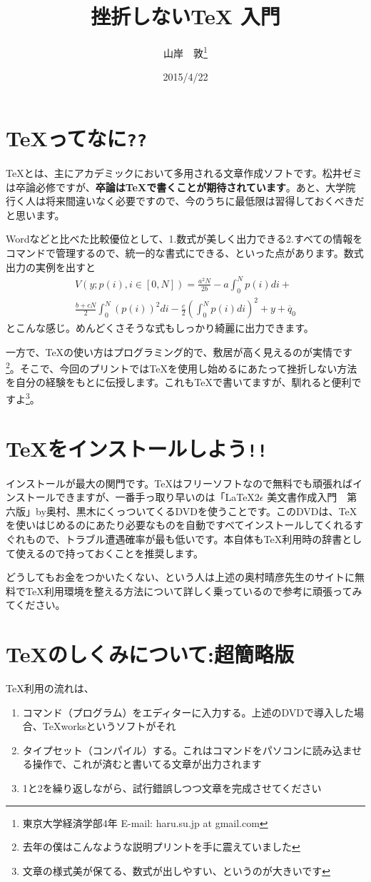 \documentclass[a4paper]{jarticle}
\title{挫折しないTeX 入門}
\author{山岸　敦\thanks{東京大学経済学部4年 E-mail: haru.su.jp at gmail.com}}
\date{2015/4/22}
\begin{document}
\maketitle

\section{\TeX ってなに\texttt{??} }
\TeX とは、主にアカデミックにおいて多用される文章作成ソフトです。松井ゼミは卒論必修ですが、{\bf 卒論は\TeX で書くことが期待されています}。あと、大学院行く人は将来間違いなく必要ですので、今のうちに最低限は習得しておくべきだと思います。

Wordなどと比べた比較優位として、1.数式が美しく出力できる2.すべての情報をコマンドで管理するので、統一的な書式にできる、といった点があります。数式出力の実例を出すと
\begin{multline}
V(y;p(i), i \in[0, N]) = \frac{a^2N}{2b} - a \int_{0}^{N}p(i)di + \\
 \frac{b + cN}{2}\int_{0}^{N}(p(i))^2di - \frac{c}{2}(\int_{0}^{N}p(i)di)^2 + y + \overline{q}_0
\end{multline}
とこんな感じ。めんどくさそうな式もしっかり綺麗に出力できます。

一方で、\TeX の使い方はプログラミング的で、敷居が高く見えるのが実情です\footnote{去年の僕はこんなような説明プリントを手に震えていました}。そこで、今回のプリントでは\TeX を使用し始めるにあたって挫折しない方法を自分の経験をもとに伝授します。これも\TeX で書いてますが、馴れると便利ですよ\footnote{文章の様式美が保てる、数式が出しやすい、というのが大きいです}。

\section{\TeX をインストールしよう\texttt{!!}}
インストールが最大の関門です。\TeX はフリーソフトなので無料でも頑張ればインストールできますが、一番手っ取り早いのは「\LaTeX $2\epsilon$ 美文書作成入門　第六版」by奥村、黒木にくっついてくるDVDを使うことです。このDVDは、\TeX を使いはじめるのにあたり必要なものを自動ですべてインストールしてくれるすぐれもので、トラブル遭遇確率が最も低いです。本自体も\TeX 利用時の辞書として使えるので持っておくことを推奨します。

どうしてもお金をつかいたくない、という人は上述の奥村晴彦先生のサイトに無料で\TeX 利用環境を整える方法について詳しく乗っているので参考に頑張ってみてください。

\section{\TeX のしくみについて:超簡略版}
\TeX 利用の流れは、
\begin{enumerate}
\item
コマンド（プログラム）をエディターに入力する。上述のDVDで導入した場合、TeXworksというソフトがそれ
\item
タイプセット（コンパイル）する。これはコマンドをパソコンに読み込ませる操作で、これが済むと書いてる文章が出力されます
\item
1と2を繰り返しながら、試行錯誤しつつ文章を完成させてください
\end{enumerate}
\end{document}
